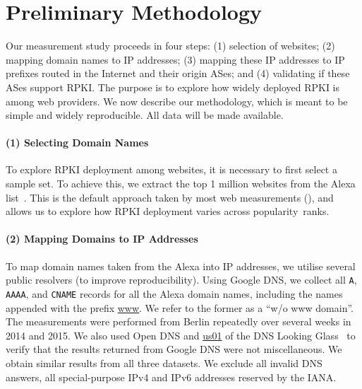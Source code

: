 

\section{Preliminary Methodology}
\label{sec:methoresults}


Our measurement study proceeds in four steps: (1) selection of websites; (2) mapping domain names to IP addresses; (3) mapping these IP addresses to IP prefixes routed in the Internet and their origin ASes; and (4) validating if these ASes support RPKI. The purpose is to explore how widely deployed RPKI is among web providers. We now describe our methodology, which is meant to be simple and widely reproducible. All data will be made available.

\iffalse
\begin{figure}
  \texttt{[image: toolchain]}
  \caption{Toolchain overview.}
  \label{fig:toolchain}
\end{figure}
\fi


\paragraph*{(1) Selecting Domain Names} 


To explore RPKI deployment among websites, it is necessary to first select a sample set. To achieve this, we extract the top 1 million websites from the Alexa list~\cite{alexa-ranking}. This is the default approach taken by most web measurements (\eg \cite{amsu-wcc-11,rkw-ddatt-12,lgs-bspdj-13,ctbo-qmclm-14}), and allows us to explore how RPKI deployment varies across popularity~ranks.





\paragraph*{(2) Mapping Domains to IP Addresses}



To map domain names taken from the Alexa into IP addresses, we utilise several public resolvers (to improve reproducibility).
Using Google DNS, we collect all \texttt{A}, \texttt{AAAA}, and \texttt{CNAME} records for all the Alexa domain names, including the names appended
with the prefix \url{www}. We refer to the former as a ``w/o www domain''. The measurements were performed from Berlin repeatedly over several weeks in 2014 and 2015.
We also used Open DNS and \url{us01} of the DNS Looking Glass~\cite{dns-lg} to verify that the results returned from Google DNS were not miscellaneous.
We obtain similar results from all three datasets.
We exclude all invalid DNS answers, \ie all
special-purpose IPv4 and IPv6 addresses reserved by the IANA.

